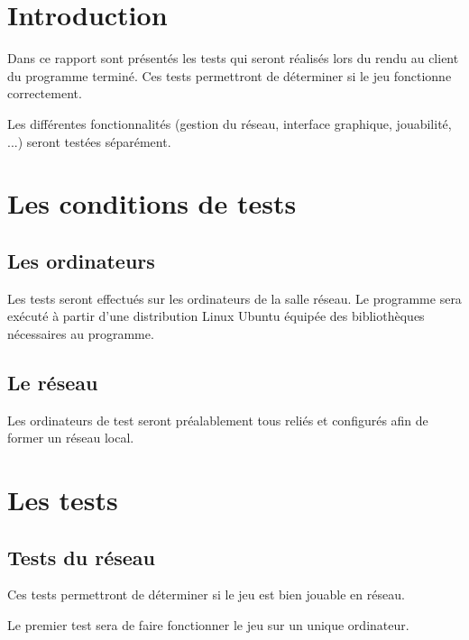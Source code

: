 \section*{Introduction}

Dans ce rapport sont présentés les tests qui seront réalisés lors du rendu au client du programme terminé. Ces tests permettront de déterminer si le jeu fonctionne correctement.

\vspace{0.5cm}

Les différentes fonctionnalités (gestion du réseau, interface graphique, jouabilité, ...) seront testées séparément.

\newpage

\section{Les conditions de tests}


\subsection{Les ordinateurs}

Les tests seront effectués sur les ordinateurs de la salle réseau. Le programme sera exécuté à partir d'une distribution Linux Ubuntu équipée des bibliothèques nécessaires au programme.

\subsection{Le réseau}

Les ordinateurs de test seront préalablement tous reliés et configurés afin de former un réseau local.


\section{Les tests}

\subsection{Tests du réseau}

Ces tests permettront de déterminer si le jeu est bien jouable en réseau.

Le premier test sera de faire fonctionner le jeu sur un unique ordinateur.

